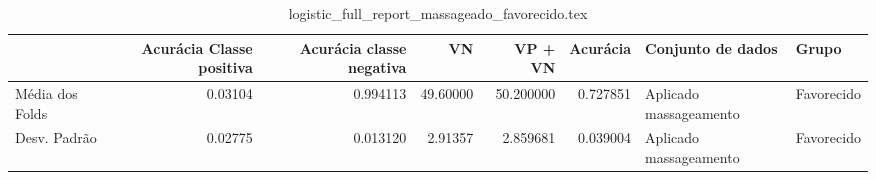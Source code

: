 \begin{table}
\centering
\caption{logistic_full_report_massageado_favorecido.tex}
\label{logistic_full_report_massageado_favorecido.tex}
\begin{tabular}{lrrrrrll}
\toprule
{} &  Acurácia Classe positiva &  Acurácia classe negativa &       VN  &   VP + VN  &  Acurácia &       Conjunto de dados &       Grupo \\
\midrule
Média dos Folds &                   0.03104 &                  0.994113 &  49.60000 &  50.200000 &  0.727851 &  Aplicado massageamento &  Favorecido \\
Desv. Padrão    &                   0.02775 &                  0.013120 &   2.91357 &   2.859681 &  0.039004 &  Aplicado massageamento &  Favorecido \\
\bottomrule
\end{tabular}
\end{table}
